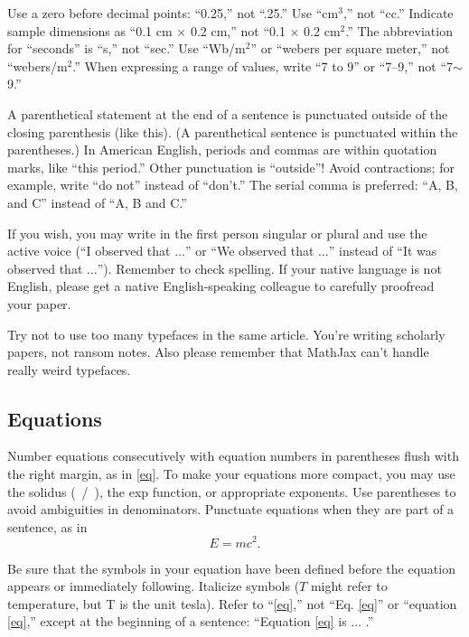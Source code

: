 \documentclass[twoside,web]{ieeecolor}
\begin{document}
Use a zero before decimal points: ``0.25,'' not ``.25.'' Use 
``cm$^{3}$,'' not ``cc.'' Indicate sample dimensions as ``0.1 cm 
$\times $ 0.2 cm,'' not ``0.1 $\times $ 0.2 cm$^{2}$.'' The 
abbreviation for ``seconds'' is ``s,'' not ``sec.'' Use 
``Wb/m$^{2}$'' or ``webers per square meter,'' not 
``webers/m$^{2}$.'' When expressing a range of values, write ``7 to 
9'' or ``7--9,'' not ``7$\sim $9.''

A parenthetical statement at the end of a sentence is punctuated outside of 
the closing parenthesis (like this). (A parenthetical sentence is punctuated 
within the parentheses.) In American English, periods and commas are within 
quotation marks, like ``this period.'' Other punctuation is ``outside''! 
Avoid contractions; for example, write ``do not'' instead of ``don't.'' The 
serial comma is preferred: ``A, B, and C'' instead of ``A, B and C.''

If you wish, you may write in the first person singular or plural and use 
the active voice (``I observed that $\ldots$'' or ``We observed that $\ldots$'' 
instead of ``It was observed that $\ldots$''). Remember to check spelling. If 
your native language is not English, please get a native English-speaking 
colleague to carefully proofread your paper.

Try not to use too many typefaces in the same article. You're writing
scholarly papers, not ransom notes. Also please remember that MathJax
can't handle really weird typefaces.

\subsection{Equations}
Number equations consecutively with equation numbers in parentheses flush 
with the right margin, as in \eqref{eq}. To make your equations more 
compact, you may use the solidus (~/~), the exp function, or appropriate 
exponents. Use parentheses to avoid ambiguities in denominators. Punctuate 
equations when they are part of a sentence, as in
\begin{equation}E=mc^2.\label{eq}\end{equation}

Be sure that the symbols in your equation have been defined before the 
equation appears or immediately following. Italicize symbols ($T$ might refer 
to temperature, but T is the unit tesla). Refer to ``\eqref{eq},'' not ``Eq. \eqref{eq}'' 
or ``equation \eqref{eq},'' except at the beginning of a sentence: ``Equation \eqref{eq} 
is $\ldots$ .''
\end{document}
